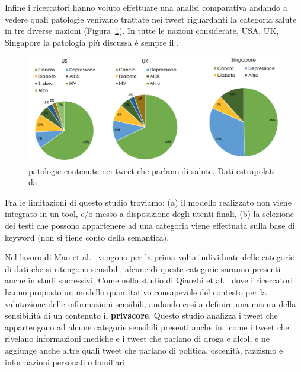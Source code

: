 Infine i ricercatori hanno voluto effettuare una analisi comparativa andando a vedere quali patologie venivano trattate nei tweet riguardanti la categoria salute in tre diverse nazioni (Figura~\ref{fig:res-patologie-nazioni}). In tutte le nazioni considerate, USA, UK, Singapore la patologia più discussa è sempre il .

\begin{figure}[h!t]
    \centering
    \includegraphics[width=15cm]{Figure/related_work/nazioni.png}
    \caption{patologie contenute nei tweet che parlano di salute. Dati estrapolati da\cite{looseTweets}}
    \label{fig:res-patologie-nazioni}
\end{figure}
\FloatBarrier


Fra le limitazioni di questo studio troviamo: (a) il modello realizzato non viene integrato in un tool, e/o messo a disposizione degli utenti finali, (b) la selezione dei testi che possono appartenere ad una categoria viene effettuata sulla base di keyword (non si tiene conto della semantica).

Nel lavoro di Mao et al.~\cite{looseTweets} vengono per la prima volta individuate delle categorie di dati che si ritengono sensibili, alcune di queste categorie saranno presenti anche in studi successivi. Come nello studio di Qiaozhi et al.~\cite{dontTweetThis} dove i ricercatori hanno proposto un modello quantitativo consapevole del contesto per la valutazione delle informazioni sensibili, andando così a definire una misura della sensibilità di un contenuto il \textbf{privscore}. Questo studio analizza i tweet che appartengono ad alcune categorie sensibili presenti anche in~\cite{looseTweets} come i tweet che rivelano informazioni mediche e i tweet che parlano di droga e alcol, e ne aggiunge anche altre quali tweet che parlano di politica, oscenità, razzismo e informazioni personali o familiari.

